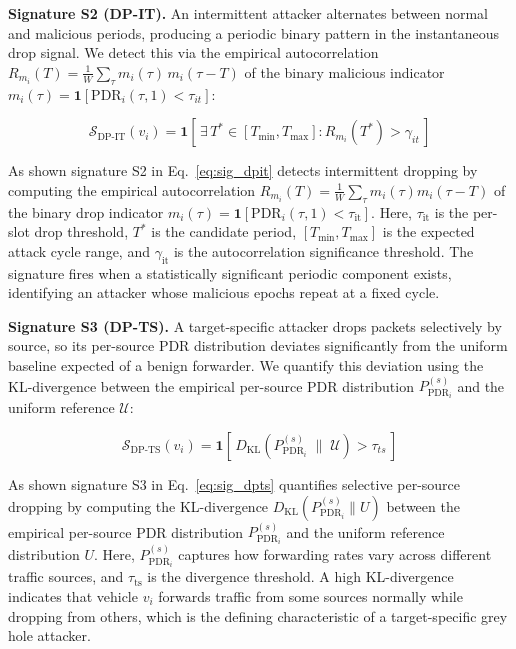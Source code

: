 \documentclass[12pt, a4paper]{report}
\begin{document}
\textbf{Signature S2 (DP-IT).} An intermittent attacker alternates between
normal and malicious periods, producing a periodic binary pattern in the
instantaneous drop signal. We detect this via the empirical autocorrelation
$R_{m_i}(T) = \frac{1}{W}\sum_\tau m_i(\tau)\,m_i(\tau{-}T)$ of the binary
malicious indicator $m_i(\tau)=\mathbf{1}[\text{PDR}_i(\tau,1)<\tau_{it}]$:

\begin{equation}
\label{eq:sig_dpit}
\mathcal{S}_{\text{DP-IT}}(v_i) =
\mathbf{1}\!\left[\,
\exists\,T^* \in [T_{\min}, T_{\max}] : R_{m_i}(T^*) > \gamma_{it}
\,\right]
\end{equation}

As shown signature S2 in Eq.~\eqref{eq:sig_dpit} detects intermittent dropping by computing the empirical autocorrelation $R_{m_i}(T) = \frac{1}{W}\sum_\tau m_i(\tau) m_i(\tau - T)$ of the binary drop indicator $m_i(\tau) = \mathbf{1}[\text{PDR}_i(\tau, 1) < \tau_{\text{it}}]$. Here, $\tau_{\text{it}}$ is the per-slot drop threshold, $T^*$ is the candidate period, $[T_{\min}, T_{\max}]$ is the expected attack cycle range, and $\gamma_{\text{it}}$ is the autocorrelation significance threshold. The signature fires when a statistically significant periodic component exists, identifying an attacker whose malicious epochs repeat at a fixed cycle.

\textbf{Signature S3 (DP-TS).} A target-specific attacker drops packets
selectively by source, so its per-source PDR distribution deviates
significantly from the uniform baseline expected of a benign forwarder.
We quantify this deviation using the KL-divergence between the empirical
per-source PDR distribution $P_{\text{PDR}_i}^{(s)}$ and the uniform
reference $\mathcal{U}$:

\begin{equation}
\label{eq:sig_dpts}
\mathcal{S}_{\text{DP-TS}}(v_i) =
\mathbf{1}\!\left[\,
D_{\mathrm{KL}}\!\left(P_{\text{PDR}_i}^{(s)} \;\|\; \mathcal{U}\right)
> \tau_{ts}
\,\right]
\end{equation}

As shown signature S3 in Eq.~\eqref{eq:sig_dpts} quantifies selective per-source dropping by computing the KL-divergence $D_{\text{KL}}\!\left(P_{\text{PDR}_i}^{(s)} \| U\right)$ between the empirical per-source PDR distribution $P_{\text{PDR}_i}^{(s)}$ and the uniform reference distribution $U$. Here, $P_{\text{PDR}_i}^{(s)}$ captures how forwarding rates vary across different traffic sources, and $\tau_{\text{ts}}$ is the divergence threshold. A high KL-divergence indicates that vehicle $v_i$ forwards traffic from some sources normally while dropping from others, which is the defining characteristic of a target-specific grey hole attacker.
\end{document}
